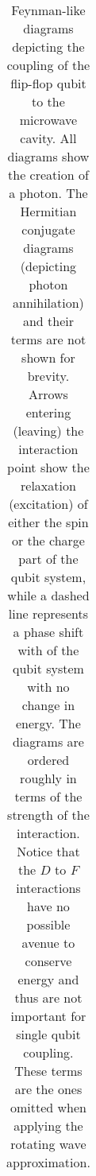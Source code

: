 \documentclass[11pt]{article}
\theoremstyle{definition}
\begin{document}
\begin{table}[]
\begin{tabular}{@{}ccc@{}}
    \end{tabular}
    \caption[Single qubit cavity coupling terms]{
        Feynman-like diagrams depicting the coupling of the flip-flop qubit to the microwave cavity. 
        All diagrams show the creation of a photon. 
        The Hermitian conjugate diagrams (depicting photon annihilation) and their terms are not shown for brevity. 
        Arrows entering (leaving) the interaction point show the relaxation (excitation) of either the spin or the charge part of the qubit system, while a dashed line represents a phase shift with of the qubit system with no change in energy. 
        The diagrams are ordered roughly in terms of the strength of the interaction. 
        Notice that the $D$ to $F$ interactions have no possible avenue to conserve energy and thus are not important for single qubit coupling.
        These terms are the ones omitted when applying the rotating wave approximation.}
    \label{TAB:single_qubit_diagrams}
\end{table}
\end{document}

